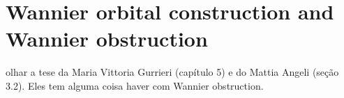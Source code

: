\documentclass[a4paper,12pt]{report}
\begin{document}


\chapter{Wannier orbital construction and Wannier obstruction}

olhar a tese da Maria Vittoria Gurrieri (capítulo 5) e do Mattia Angeli (seção 3.2). Eles tem alguma coisa haver com Wannier obstruction.




%


\end{document}
